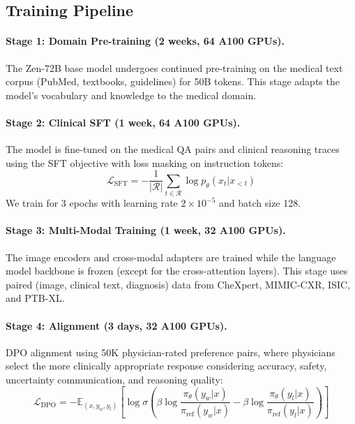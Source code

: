 \documentclass[11pt,a4paper]{article}
\begin{document}
\subsection{Training Pipeline}

\paragraph{Stage 1: Domain Pre-training (2 weeks, 64 A100 GPUs).} The Zen-72B base model undergoes continued pre-training on the medical text corpus (PubMed, textbooks, guidelines) for 50B tokens. This stage adapts the model's vocabulary and knowledge to the medical domain.

\paragraph{Stage 2: Clinical SFT (1 week, 64 A100 GPUs).} The model is fine-tuned on the medical QA pairs and clinical reasoning traces using the SFT objective with loss masking on instruction tokens:
\begin{equation}
    \mathcal{L}_{\text{SFT}} = -\frac{1}{|\mathcal{R}|}\sum_{t \in \mathcal{R}} \log p_\theta(x_t | x_{<t})
\end{equation}
We train for 3 epochs with learning rate $2 \times 10^{-5}$ and batch size 128.

\paragraph{Stage 3: Multi-Modal Training (1 week, 32 A100 GPUs).} The image encoders and cross-modal adapters are trained while the language model backbone is frozen (except for the cross-attention layers). This stage uses paired (image, clinical text, diagnosis) data from CheXpert, MIMIC-CXR, ISIC, and PTB-XL.

\paragraph{Stage 4: Alignment (3 days, 32 A100 GPUs).} DPO alignment using 50K physician-rated preference pairs, where physicians select the more clinically appropriate response considering accuracy, safety, uncertainty communication, and reasoning quality:
\begin{equation}
    \mathcal{L}_{\text{DPO}} = -\mathbb{E}_{(x, y_w, y_l)} \left[\log \sigma\left(\beta \log \frac{\pi_\theta(y_w|x)}{\pi_{\text{ref}}(y_w|x)} - \beta \log \frac{\pi_\theta(y_l|x)}{\pi_{\text{ref}}(y_l|x)}\right)\right]
\end{equation}
\end{document}
